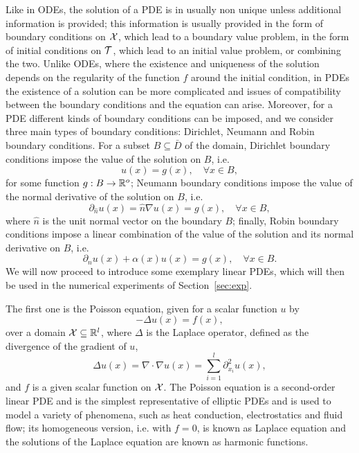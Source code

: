 Like in ODEs, the solution of a PDE is in usually non unique unless additional information is provided; this information is usually provided in the form of boundary conditions on $\mathcal X$, which lead to a boundary value problem, in the form of initial conditions on $\mathcal T$, which lead to an initial value problem, or combining the two.
Unlike ODEs, where the existence and uniqueness of the solution depends on the regularity of the function $f$ around the initial condition, in PDEs the existence of a solution can be more complicated and issues of compatibility between the boundary conditions and the equation can arise.
Moreover, for a PDE different kinds of boundary conditions can be imposed, and we consider three main types of boundary conditions: Dirichlet, Neumann and Robin boundary conditions.
For a subset $B \subseteq \bar D$ of the domain, Dirichlet boundary conditions impose the value of the solution on $B$, i.e.
\[
    u(x) = g(x), \quad \forall x \in B,
\]
for some function $g: B \rightarrow \mathbb{R}^o$;
Neumann boundary conditions impose the value of the normal derivative of the solution on $B$, i.e.
\[
    \partial_{\hat{n}} u(x)= \hat n \nabla u(x) = g(x), \quad \forall x \in B,
\]
where $\hat n$ is the unit normal vector on the boundary $B$; 
finally, Robin boundary conditions impose a linear combination of the value of the solution and its normal derivative on $B$, i.e.
\[
    \partial_{\hat{n}} u(x) + \alpha(x) u(x) = g(x), \quad \forall x \in B.
\]
We will now proceed to introduce some exemplary linear PDEs, which will then be used in the numerical experiments of Section~\ref{sec:exp}.\medskip

The first one is the Poisson equation, given for a scalar function $u$ by 
\begin{equation}\label{eq:Poisson}
    -\Delta u(x) = f(x), 
\end{equation}
over a domain $\mathcal X \subseteq \mathbb{R}^l$, where $\Delta$ is the Laplace operator, defined as the divergence of the gradient of $u$, 
\[
    \Delta u(x) = \nabla \cdot \nabla u(x) = \sum_{i=1}^{l} \partial^2_{x_i} u(x), 
\] and $f$ is a given scalar function on $\mathcal X$.
The Poisson equation is a second-order linear PDE and is the simplest representative of elliptic PDEs and is used to model a variety of phenomena, such as heat conduction, electrostatics and fluid flow; its homogeneous version, i.e. with $f=0$, is known as Laplace equation and the solutions of the Laplace equation are known as harmonic functions.

